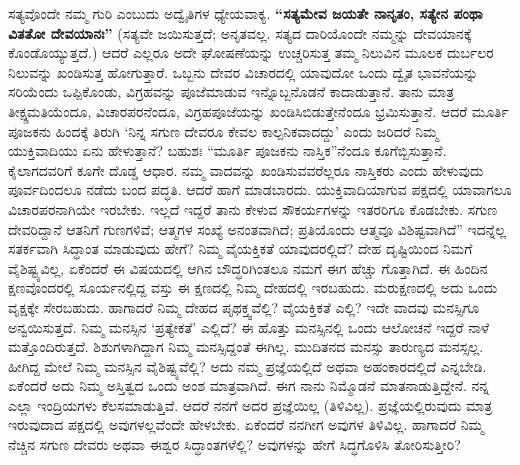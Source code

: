 ಸತ್ಯವೊಂದೇ ನಮ್ಮ ಗುರಿ ಎಂಬುದು ಅದ್ವೈತಿಗಳ ಧ್ಯೇಯವಾಕ್ಯ. \textbf{“ಸತ್ಯಮೇವ ಜಯತೇ ನಾನೃತಂ, ಸತ್ಯೇನ ಪಂಥಾ ವಿತತೋ ದೇವಯಾನಃ”} (ಸತ್ಯವೇ ಜಯಿಸುತ್ತದೆ; ಅನೃತವಲ್ಲ. ಸತ್ಯದ ದಾರಿಯೊಂದೇ ನಮ್ಮನ್ನು ದೇವಯಾನಕ್ಕೆ ಕೊಂಡೊಯ್ಯುತ್ತದೆ.) ಆದರೆ ಎಲ್ಲರೂ ಅದೇ ಘೋಷಣೆಯನ್ನು ಉಚ್ಚರಿಸುತ್ತ ತಮ್ಮ ನಿಲುವಿನ ಮೂಲಕ ದುರ್ಬಲರ ನಿಲುವನ್ನು ಖಂಡಿಸುತ್ತ ಹೋಗುತ್ತಾರೆ. ಒಬ್ಬನು ದೇವರ ವಿಚಾರದಲ್ಲಿ ಯಾವುದೋ ಒಂದು ದ್ವೈತ ಭಾವನೆಯನ್ನು ಸರಿಯೆಂದು ಒಪ್ಪಿಕೊಂಡು, ವಿಗ್ರಹವನ್ನು ಪೂಜೆಮಾಡುವ ಇನ್ನೊಬ್ಬನೊಡನೆ ಕಾದಾಡುತ್ತಾನೆ. ತಾನು ಮಾತ್ರ ತೀಕ್ಷ್ಣಮತಿಯೆಂದೂ, ವಿಚಾರಪರನೆಂದೂ, ವಿಗ್ರಹಪೂಜೆಯನ್ನು ಖಂಡಿಸಿಬಿಡುತ್ತೇನೆಂದೂ ಭ್ರಮಿಸುತ್ತಾನೆ. ಆದರೆ ಮೂರ್ತಿ ಪೂಜಕನು ಹಿಂದಕ್ಕೆ ತಿರುಗಿ ‘ನಿನ್ನ ಸಗುಣ ದೇವರೂ ಕೇವಲ ಕಾಲ್ಪನಿಕವಾದದ್ದು’ ಎಂದು ಜರಿದರೆ ನಿಮ್ಮ ಯುಕ್ತಿವಾದಿಯು ಏನು ಹೇಳುತ್ತಾನೆ? ಬಹುಶಃ “ಮೂರ್ತಿ ಪೂಜಕನು ನಾಸ್ತಿಕ”ನೆಂದೂ ಕೂಗೆಬ್ಬಿಸುತ್ತಾನೆ. ಕೈಲಾಗದವರಿಗೆ ಕೂಗೇ ದೊಡ್ಡ ಆಧಾರ. ನಮ್ಮ ವಾದವನ್ನು ಖಂಡಿಸುವವರೆಲ್ಲರೂ ನಾಸ್ತಿಕರು ಎಂದು ಹೇಳುವುದು ಪೂರ್ವದಿಂದಲೂ ನಡೆದು ಬಂದ ಪದ್ಧತಿ. ಆದರೆ ಹಾಗೆ ಮಾಡಬಾರದು. ಯುಕ್ತಿವಾದಿಯಾಗುವ ಪಕ್ಷದಲ್ಲಿ ಯಾವಾಗಲೂ ವಿಚಾರಪರನಾಗಿಯೇ ಇರಬೇಕು. ಇಲ್ಲದೆ ಇದ್ದರೆ ತಾನು ಕೇಳುವ ಸೌಕರ್ಯಗಳನ್ನು ಇತರರಿಗೂ ಕೊಡಬೇಕು. ಸಗುಣ ದೇವರಿದ್ದಾನೆ ಆತನಿಗೆ ಗುಣಗಳಿವೆ; ಆತ್ಮಗಳ ಸಂಖ್ಯೆ ಅನಂತವಾಗಿದೆ; ಪ್ರತಿಯೊಂದು ಆತ್ಮವೂ ವಿಶಿಷ್ಟವಾಗಿದೆ” ಇದನ್ನೆಲ್ಲ ಸತರ್ಕವಾಗಿ ಸಿದ್ಧಾಂತ ಮಾಡುವುದು ಹೇಗೆ? ನಿಮ್ಮ ವೈಯಕ್ತಿಕತೆ ಯಾವುದರಲ್ಲಿದೆ? ದೇಹ ದೃಷ್ಟಿಯಿಂದ ನಿಮಗೆ ವೈಶಿಷ್ಟ್ಯವಿಲ್ಲ, ಏಕೆಂದರೆ ಈ ವಿಷಯದಲ್ಲಿ ಆಗಿನ ಬೌದ್ಧರಿಗಿಂತಲೂ ನಮಗೆ ಈಗ ಹೆಚ್ಚು ಗೊತ್ತಾಗಿದೆ. ಈ ಹಿಂದಿನ ಕ್ಷಣವೊಂದರಲ್ಲಿ ಸೂರ್ಯನಲ್ಲಿದ್ದ ವಸ್ತು ಈ ಕ್ಷಣದಲ್ಲಿ ನಿಮ್ಮ ದೇಹದಲ್ಲಿ ಇರಬಹುದು. ಮರುಕ್ಷಣದಲ್ಲಿ ಅದು ಒಂದು ವೃಕ್ಷಕ್ಕೇ ಸೇರಬಹುದು. ಹಾಗಾದರೆ ನಿಮ್ಮ ದೇಹದ ಪೃಥಕ್ತ್ವವೆಲ್ಲಿ? ವೈಯಕ್ತಿಕತೆ ಎಲ್ಲಿ? ಇದೇ ವಾದವು ಮನಸ್ಸಿಗೂ ಅನ್ವಯಿಸುತ್ತದೆ. ನಿಮ್ಮ ಮನಸ್ಸಿನ ‘ಪ್ರತ್ಯೇಕತೆ’ ಎಲ್ಲಿದೆ? ಈ ಹೊತ್ತು ಮನಸ್ಸಿನಲ್ಲಿ ಒಂದು ಆಲೋಚನೆ ಇದ್ದರೆ ನಾಳೆ ಮತ್ತೊಂದಿರುತ್ತದೆ. ಶಿಶುಗಳಾಗಿದ್ದಾಗ ನಿಮ್ಮ ಮನಸ್ಸಿದ್ದಂತೆ ಈಗಿಲ್ಲ. ಮುದಿತನದ ಮನಸ್ಸು ತಾರುಣ್ಯದ ಮನಸ್ಸಲ್ಲ. ಹೀಗಿದ್ದ ಮೇಲೆ ನಿಮ್ಮ ಮನಸ್ಸಿನ ವೈಶಿಷ್ಟ್ಯವೆಲ್ಲಿ? ಅದು ನಮ್ಮ ಪ್ರಜ್ಞೆಯಲ್ಲಿದೆ ಅಥವಾ ಅಹಂಕಾರದಲ್ಲಿದೆ ಎನ್ನಬೇಡಿ. ಏಕೆಂದರೆ ಅದು ನಿಮ್ಮ ಅಸ್ತಿತ್ವದ ಒಂದು ಅಂಶ ಮಾತ್ರವಾಗಿದೆ. ಈಗ ನಾನು ನಿಮ್ಮೊಡನೆ ಮಾತನಾಡುತ್ತಿದ್ದೇನೆ. ನನ್ನ ಎಲ್ಲಾ ಇಂದ್ರಿಯಗಳು ಕೆಲಸಮಾಡುತ್ತಿವೆ. ಆದರೆ ನನಗೆ ಅದರ ಪ್ರಜ್ಞೆಯಿಲ್ಲ (ತಿಳಿವಿಲ್ಲ). ಪ್ರಜ್ಞೆಯಲ್ಲಿರುವುದು ಮಾತ್ರ ಇರುವುದಾದ ಪಕ್ಷದಲ್ಲಿ ಅವುಗಳಲ್ಲವೆಂದೇ ಹೇಳಬೇಕು. ಏಕೆಂದರೆ ನನಗೀಗ ಅವುಗಳ ತಿಳಿವಿಲ್ಲ. ಹಾಗಾದರೆ ನಿಮ್ಮ ನೆಚ್ಚಿನ ಸಗುಣ ದೇವರು ಅಥವಾ ಈಶ್ವರ ಸಿದ್ಧಾಂತಗಳೆಲ್ಲಿ? ಅವುಗಳನ್ನು ಹೇಗೆ ಸಿದ್ಧಗೊಳಿಸಿ ತೋರಿಸುತ್ತೀರಿ?

